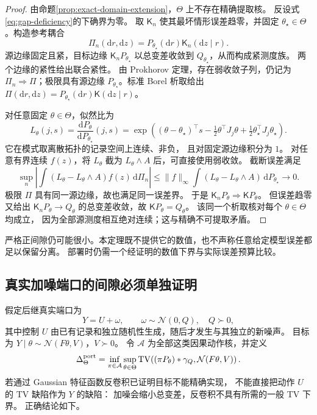 \documentclass[UTF8,fontset=fandol,zihao=5,a4paper]{ctexart}
\theoremstyle{definition}
\theoremstyle{remark}\newtheorem{remark}[theorem]{说明}
\numberwithin{equation}{section}
\begin{document}
\begin{proof}
由命题\ref{prop:exact-domain-extension}，$\Theta$ 上不存在精确提取核。
反设式\eqref{eq:gap-deficiency}的下确界为零。
取 $\mathsf K_n$ 使其最坏情形误差趋零，并固定
$\theta_\star\in\Theta$。构造参考耦合
\[
 \Pi_n(\mathrm dr,\mathrm dz)
 =P_{\theta_\star}(\mathrm dr)\mathsf K_n(\mathrm dz\mid r).
\]
源边缘固定且紧，目标边缘
$\mathsf K_nP_{\theta_\star}$ 以总变差收敛到
$Q_{\theta_\star}$，从而构成紧测度族。
两个边缘的紧性给出联合紧性。
由 Prokhorov 定理，存在弱收敛子列，仍记为
$\Pi_n\Rightarrow\Pi$；极限具有源边缘
$P_{\theta_\star}$。标准 Borel 析取给出
$\Pi(\mathrm dr,\mathrm dz)
=P_{\theta_\star}(\mathrm dr)\mathsf K(\mathrm dz\mid r)$。

对任意固定 $\theta\in\Theta$，似然比为
\[
 L_\theta(j,s)
 =\frac{\mathrm dP_\theta}{\mathrm dP_{\theta_\star}}(j,s)
 =\exp\!\left((\theta-\theta_\star)^\top s
 -\tfrac12\theta^\top J_j\theta
 +\tfrac12\theta_\star^\top J_j\theta_\star\right).
\]
它在模式取离散拓扑的记录空间上连续、非负，
且对固定源边缘积分为 $1$。
对任意有界连续 $f(z)$，将 $L_\theta$ 截为
$L_\theta\wedge A$ 后，可直接使用弱收敛。
截断误差满足
\[
 \sup_n\left|\int
 (L_\theta-L_\theta\wedge A)f(z)\,\mathrm d\Pi_n\right|
 \leq\|f\|_\infty
 \int(L_\theta-L_\theta\wedge A)\,\mathrm dP_{\theta_\star}
 \longrightarrow0.
\]
极限 $\Pi$ 具有同一源边缘，故也满足同一误差界。
于是 $\mathsf K_nP_\theta\Rightarrow\mathsf KP_\theta$。
但误差趋零又给出
$\mathsf K_nP_\theta\to Q_\theta$ 的总变差收敛，故
$\mathsf KP_\theta=Q_\theta$。
该同一个析取核对每个 $\theta\in\Theta$ 均成立，
因为全部源测度相互绝对连续；这与精确不可提取矛盾。
\end{proof}

严格正间隙仍可能很小。本定理既不提供它的数值，也不声称任意给定模型误差都足以保留分离。
部署时仍需一个经证明的数值下界与实际误差预算比较。

\subsection{真实加噪端口的间隙必须单独证明}

假定后继真实端口为
\begin{equation}
 Y=U+\omega,\qquad
 \omega\sim\mathcal N(0,Q),\quad Q\succ0,
 \label{eq:gap-physical-port}
\end{equation}
其中控制 $U$ 由已有记录和独立随机性生成，随后才发生与其独立的新噪声。
目标为 $Y\mid\theta\sim\mathcal N(F\theta,V)$，$V\succ0$。
令 $\mathcal A$ 为全部这类因果动作核，并定义
\begin{equation}
 \Delta_\Theta^{\rm port}
 =\inf_{\pi\in\mathcal A}\sup_{\theta\in\Theta}
 \operatorname{TV}\!\left(
  (\pi P_\theta)*\gamma_Q,\mathcal N(F\theta,V)\right).
 \label{eq:gap-port-deficiency}
\end{equation}
若通过 Gaussian 特征函数反卷积已证明目标不能精确实现，
不能直接把动作 $U$ 的 TV 缺陷作为 $Y$ 的缺陷：
加噪会缩小总变差，反卷积不具有所需的一般 TV 下界。
正确结论如下。
\end{document}
